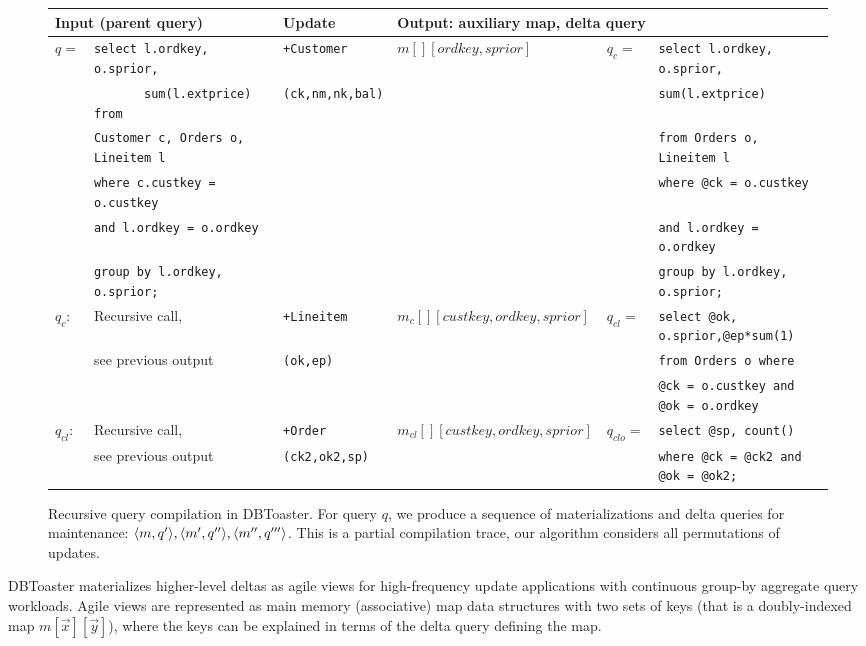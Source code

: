 \def \sql#1{{\scriptsize {\tt #1}}}
\begin{figure*}[htbp]

\vspace{-8mm}

\hspace{-3mm}\begin{tabular}{ll|l|l|ll}
\multicolumn{2}{l|}{Input (parent query)}
& Update 
& \multicolumn{3}{l}{Output: auxiliary map, delta query}
\\
\hline
$q =$
& \sql{select l.ordkey, o.sprior,}
& \texttt{+Customer}
& $m[][ordkey,sprior]$
& $q_c =$
& \sql{select l.ordkey, o.sprior,}
\\
& \sql{\ \ \ \ \ \ \ sum(l.extprice) from}
& \texttt{(ck,nm,nk,bal)}
& & & \sql{sum(l.extprice)}
\\
& \sql{Customer c, Orders o, Lineitem l}
& & & & \sql{from Orders o, Lineitem l}
\\
& \sql{where c.custkey = o.custkey}
& & & & \sql{where @ck = o.custkey} 
\\
& \sql{and l.ordkey = o.ordkey}
& & & & \sql{and l.ordkey = o.ordkey}
\\
& \sql{group by l.ordkey, o.sprior;}
& & & & \sql{group by l.ordkey, o.sprior;}
\\
\hline
$q_c$:
& Recursive call,
& \texttt{+Lineitem} 
& $m_c[][custkey,ordkey,sprior]$
& $q_{cl} =$ & \sql{select @ok, o.sprior,@ep*sum(1)}
\\
& see previous output
& \texttt{(ok,ep)} & & & \sql{from Orders o where}
\\
& & & & & \sql{@ck = o.custkey and @ok = o.ordkey}
\\
\hline
$q_{cl}$:
& Recursive call,
& \texttt{+Order} 
& $m_{cl}[][custkey,ordkey,sprior]$
& $q_{clo}=$ & \sql{select @sp, count()}
\\
& see previous output
& \texttt{(ck2,ok2,sp)}
& & & \sql{where @ck = @ck2 and @ok = @ok2;}
\end{tabular}
\caption{Recursive query compilation in DBToaster. For query $q$, we produce a
sequence of materializations and delta queries for maintenance: ${\langle m,q'\rangle},
{\langle m',q''\rangle}, {\langle m'',q'''\rangle}$. This is a partial compilation trace, our
algorithm considers all permutations of updates.}
\label{fig:compex}
\vspace{-4mm}
\end{figure*}

DBToaster materializes higher-level deltas as agile views for high-frequency
update applications with continuous group-by aggregate query workloads. Agile
views are represented as main memory (associative) map data structures with two
sets of keys (that is a doubly-indexed map $m[\vec{x}][\vec{y}]$), where the
keys can be explained in terms of the delta query defining the map.


